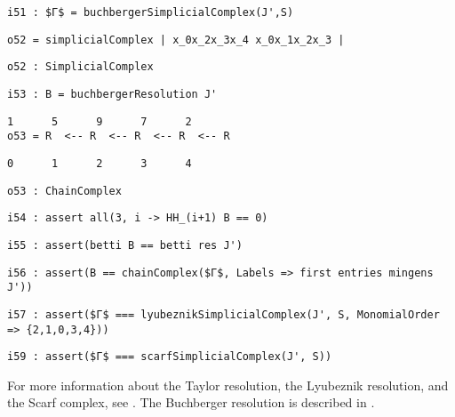 \documentclass[12pt,leqno]{amsart}
\theoremstyle{definition}
\begin{document}
\begin{lstlisting}[xleftmargin=10pt, aboveskip=1.5pt, belowskip=1.5pt]
i51 : $Γ$ = buchbergerSimplicialComplex(J',S)
\end{lstlisting}
\begin{lstlisting}[xleftmargin=10pt, aboveskip=1.5pt, belowskip=1.5pt]
o52 = simplicialComplex | x_0x_2x_3x_4 x_0x_1x_2x_3 |
\end{lstlisting}
\begin{lstlisting}[xleftmargin=10pt, aboveskip=1.5pt, belowskip=1.5pt]
o52 : SimplicialComplex
\end{lstlisting}
\begin{lstlisting}[xleftmargin=10pt, aboveskip=1.5pt, belowskip=1.5pt]
i53 : B = buchbergerResolution J'
\end{lstlisting}
\begin{lstlisting}[xleftmargin=10pt, lineskip=-10pt, aboveskip=1.5pt, belowskip=1.5pt]
       1      5      9      7      2
o53 = R  <-- R  <-- R  <-- R  <-- R
\end{lstlisting}
\begin{lstlisting}[xleftmargin=10pt, aboveskip=1.5pt, belowskip=1.5pt]
      0      1      2      3      4
\end{lstlisting}
\begin{lstlisting}[xleftmargin=10pt, aboveskip=1.5pt, belowskip=1.5pt]
o53 : ChainComplex
\end{lstlisting}
\begin{lstlisting}[xleftmargin=10pt, aboveskip=1.5pt, belowskip=1.5pt]
i54 : assert all(3, i -> HH_(i+1) B == 0) 
\end{lstlisting}
\begin{lstlisting}[xleftmargin=10pt, aboveskip=1.5pt, belowskip=1.5pt]
i55 : assert(betti B == betti res J')
\end{lstlisting}
\begin{lstlisting}[xleftmargin=10pt, aboveskip=1.5pt, belowskip=1.5pt]
i56 : assert(B == chainComplex($Γ$, Labels => first entries mingens J'))
\end{lstlisting}
\begin{lstlisting}[xleftmargin=10pt, aboveskip=1.5pt, belowskip=1.5pt]
i57 : assert($Γ$ === lyubeznikSimplicialComplex(J', S, MonomialOrder => {2,1,0,3,4}))
\end{lstlisting}
\begin{lstlisting}[xleftmargin=10pt, aboveskip=1.5pt, belowskip=3.0pt]
i59 : assert($Γ$ === scarfSimplicialComplex(J', S))
\end{lstlisting}
For more information about the Taylor resolution, the Lyubeznik resolution,
and the Scarf complex, see \cite{Mermin}.  The Buchberger resolution is
described in \cite{OW}.  
\end{document}
